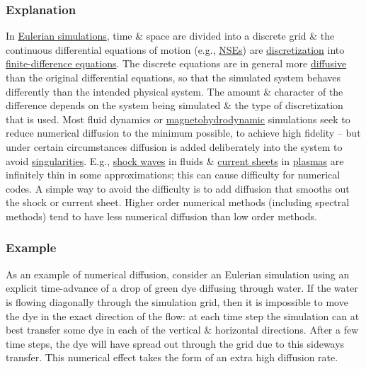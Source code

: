 \documentclass{article}
\begin{document}
\subsubsection{Explanation}
In \href{https://en.wikipedia.org/wiki/Eulerian_method}{Eulerian simulations}, time \& space are divided into a discrete grid \& the continuous differential equations of motion (e.g., \href{https://en.wikipedia.org/wiki/Navier%E2%80%93Stokes_equation}{NSEs}) are \href{https://en.wikipedia.org/wiki/Discretization}{discretization} into \href{https://en.wikipedia.org/wiki/Finite-difference_equation}{finite-difference equations}. The discrete equations are in general more \href{https://en.wikipedia.org/wiki/Diffusion}{diffusive} than the original differential equations, so that the simulated system behaves differently than the intended physical system. The amount \& character of the difference depends on the system being simulated \& the type of discretization that is used. Most fluid dynamics or \href{https://en.wikipedia.org/wiki/Magnetohydrodynamics}{magnetohydrodynamic} simulations seek to reduce numerical diffusion to the minimum possible, to achieve high fidelity -- but under certain circumstances diffusion is added deliberately into the system to avoid \href{https://en.wikipedia.org/wiki/Mathematical_singularity}{singularities}. E.g., \href{https://en.wikipedia.org/wiki/Shock_wave}{shock waves} in fluids \& \href{https://en.wikipedia.org/wiki/Current_sheet}{current sheets} in \href{https://en.wikipedia.org/wiki/Plasma_(physics)}{plasmas} are infinitely thin in some approximations; this can cause difficulty for numerical codes. A simple way to avoid the difficulty is to add diffusion that smooths out the shock or current sheet. Higher order numerical methods (including spectral methods) tend to have less numerical diffusion than low order methods.

\subsubsection{Example}
As an example of numerical diffusion, consider an Eulerian simulation using an explicit time-advance of a drop of green dye diffusing through water. If the water is flowing diagonally through the simulation grid, then it is impossible to move the dye in the exact direction of the flow: at each time step the simulation can at best transfer some dye in each of the vertical \& horizontal directions. After a few time steps, the dye will have spread out through the grid due to this sideways transfer. This numerical effect takes the form of an extra high diffusion rate.
\end{document}

